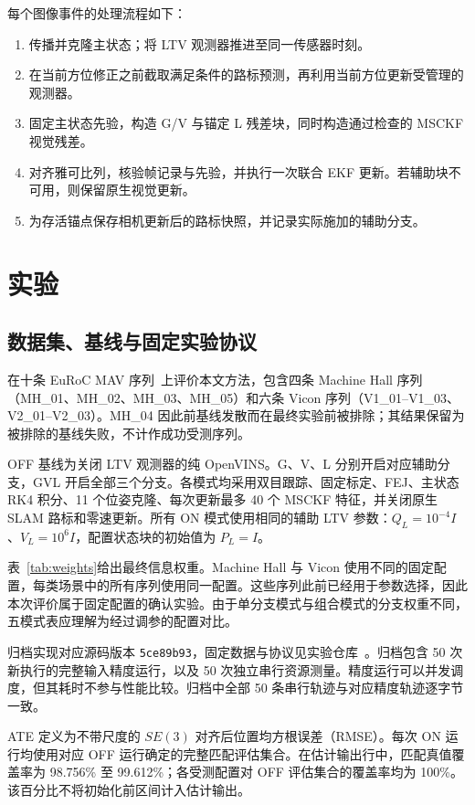 \documentclass[a4paper,runningheads]{llncs}
\begin{document}
每个图像事件的处理流程如下：
\begin{enumerate}
\item 传播并克隆主状态；将 LTV 观测器推进至同一传感器时刻。
\item 在当前方位修正之前截取满足条件的路标预测，再利用当前方位更新受管理的观测器。
\item 固定主状态先验，构造 G/V 与锚定 L 残差块，同时构造通过检查的 MSCKF 视觉残差。
\item 对齐雅可比列，核验帧记录与先验，并执行一次联合 EKF 更新。若辅助块不可用，则保留原生视觉更新。
\item 为存活锚点保存相机更新后的路标快照，并记录实际施加的辅助分支。
\end{enumerate}

\section{实验}
\subsection{数据集、基线与固定实验协议}
在十条 EuRoC MAV 序列~\cite{burri2016}上评价本文方法，包含四条 Machine Hall 序列（MH\_01、MH\_02、MH\_03、MH\_05）和六条 Vicon 序列（V1\_01--V1\_03、V2\_01--V2\_03）。MH\_04 因此前基线发散而在最终实验前被排除；其结果保留为被排除的基线失败，不计作成功受测序列。

OFF 基线为关闭 LTV 观测器的纯 OpenVINS。G、V、L 分别开启对应辅助分支，GVL 开启全部三个分支。各模式均采用双目跟踪、固定标定、FEJ、主状态 RK4 积分、11 个位姿克隆、每次更新最多 40 个 MSCKF 特征，并关闭原生 SLAM 路标和零速更新。所有 ON 模式使用相同的辅助 LTV 参数：$Q_L=10^{-4}I$、$V_L=10^6I$，配置状态块的初始值为 $P_L=I$。

表~\ref{tab:weights}给出最终信息权重。Machine Hall 与 Vicon 使用不同的固定配置，每类场景中的所有序列使用同一配置。这些序列此前已经用于参数选择，因此本次评价属于固定配置的确认实验。由于单分支模式与组合模式的分支权重不同，五模式表应理解为经过调参的配置对比。


归档实现对应源码版本 \texttt{5ce89b93}，固定数据与协议见实验仓库~\cite{experiment2026}。归档包含 50 次新执行的完整输入精度运行，以及 50 次独立串行资源测量。精度运行可以并发调度，但其耗时不参与性能比较。归档中全部 50 条串行轨迹与对应精度轨迹逐字节一致。

ATE 定义为不带尺度的 $SE(3)$ 对齐后位置均方根误差（RMSE）。每次 ON 运行均使用对应 OFF 运行确定的完整匹配评估集合。在估计输出行中，匹配真值覆盖率为 98.756\% 至 99.612\%；各受测配置对 OFF 评估集合的覆盖率均为 100\%。该百分比不将初始化前区间计入估计输出。
\end{document}
